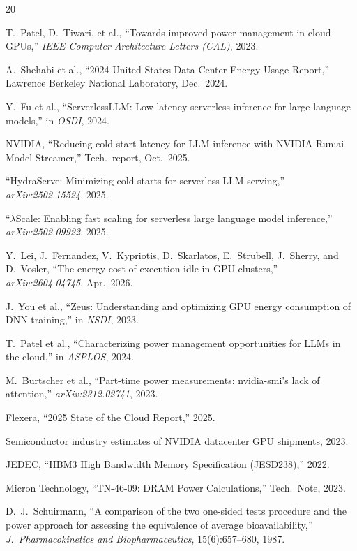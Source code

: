 \documentclass[conference]{IEEEtran}
\begin{document}
\begin{thebibliography}{20}

T.~Patel, D.~Tiwari, et al., ``Towards improved power management in cloud GPUs,'' \emph{IEEE Computer Architecture Letters (CAL)}, 2023.

A.~Shehabi et al., ``2024 United States Data Center Energy Usage Report,'' Lawrence Berkeley National Laboratory, Dec.\ 2024.

Y.~Fu et al., ``ServerlessLLM: Low-latency serverless inference for large language models,'' in \emph{OSDI}, 2024.

NVIDIA, ``Reducing cold start latency for LLM inference with NVIDIA Run:ai Model Streamer,'' Tech.\ report, Oct.\ 2025.

``HydraServe: Minimizing cold starts for serverless LLM serving,'' \emph{arXiv:2502.15524}, 2025.

``$\lambda$Scale: Enabling fast scaling for serverless large language model inference,'' \emph{arXiv:2502.09922}, 2025.

Y.~Lei, J.~Fernandez, V.~Kypriotis, D.~Skarlatos, E.~Strubell, J.~Sherry, and D.~Vosler, ``The energy cost of execution-idle in GPU clusters,'' \emph{arXiv:2604.04745}, Apr.\ 2026.

J.~You et al., ``Zeus: Understanding and optimizing GPU energy consumption of DNN training,'' in \emph{NSDI}, 2023.

T.~Patel et al., ``Characterizing power management opportunities for LLMs in the cloud,'' in \emph{ASPLOS}, 2024.

M.~Burtscher et al., ``Part-time power measurements: nvidia-smi's lack of attention,'' \emph{arXiv:2312.02741}, 2023.

Flexera, ``2025 State of the Cloud Report,'' 2025.

Semiconductor industry estimates of NVIDIA datacenter GPU shipments, 2023.

JEDEC, ``HBM3 High Bandwidth Memory Specification (JESD238),'' 2022.

Micron Technology, ``TN-46-09: DRAM Power Calculations,'' Tech.\ Note, 2023.

D.~J.~Schuirmann, ``A comparison of the two one-sided tests procedure and the power approach for assessing the equivalence of average bioavailability,'' \emph{J.\ Pharmacokinetics and Biopharmaceutics}, 15(6):657--680, 1987.


\end{thebibliography}
\end{document}
